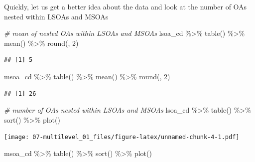 \documentclass[
]{book}
\newenvironment{Shaded}{\begin{snugshade}}{\end{snugshade}}
\newcommand{\CommentTok}[1]{\textcolor[rgb]{0.56,0.35,0.01}{\textit{#1}}}
\newcommand{\DecValTok}[1]{\textcolor[rgb]{0.00,0.00,0.81}{#1}}
\newcommand{\FunctionTok}[1]{\textcolor[rgb]{0.00,0.00,0.00}{#1}}
\newcommand{\NormalTok}[1]{#1}
\newcommand{\SpecialCharTok}[1]{\textcolor[rgb]{0.00,0.00,0.00}{#1}}
\begin{document}
Quickly, let us get a better idea about the data and look at the number of OAs nested within LSOAs and MSOAs

\begin{Shaded}
\begin{Highlighting}[]
\CommentTok{\# mean of nested OAs within LSOAs and MSOAs}
\NormalTok{lsoa\_cd }\SpecialCharTok{\%\textgreater{}\%} \FunctionTok{table}\NormalTok{() }\SpecialCharTok{\%\textgreater{}\%}
  \FunctionTok{mean}\NormalTok{() }\SpecialCharTok{\%\textgreater{}\%}
  \FunctionTok{round}\NormalTok{(, }\DecValTok{2}\NormalTok{)}
\end{Highlighting}
\end{Shaded}

\begin{verbatim}
## [1] 5
\end{verbatim}

\begin{Shaded}
\begin{Highlighting}[]
\NormalTok{msoa\_cd }\SpecialCharTok{\%\textgreater{}\%} \FunctionTok{table}\NormalTok{() }\SpecialCharTok{\%\textgreater{}\%}
  \FunctionTok{mean}\NormalTok{() }\SpecialCharTok{\%\textgreater{}\%}
  \FunctionTok{round}\NormalTok{(, }\DecValTok{2}\NormalTok{)}
\end{Highlighting}
\end{Shaded}

\begin{verbatim}
## [1] 26
\end{verbatim}

\begin{Shaded}
\begin{Highlighting}[]
\CommentTok{\# number of OAs nested within LSOAs and MSOAs}
\NormalTok{lsoa\_cd }\SpecialCharTok{\%\textgreater{}\%} \FunctionTok{table}\NormalTok{() }\SpecialCharTok{\%\textgreater{}\%}
  \FunctionTok{sort}\NormalTok{() }\SpecialCharTok{\%\textgreater{}\%}
  \FunctionTok{plot}\NormalTok{()}
\end{Highlighting}
\end{Shaded}

\texttt{[image: 07-multilevel\_01\_files/figure-latex/unnamed-chunk-4-1.pdf]}

\begin{Shaded}
\begin{Highlighting}[]
\NormalTok{msoa\_cd }\SpecialCharTok{\%\textgreater{}\%} \FunctionTok{table}\NormalTok{() }\SpecialCharTok{\%\textgreater{}\%}
  \FunctionTok{sort}\NormalTok{() }\SpecialCharTok{\%\textgreater{}\%}
  \FunctionTok{plot}\NormalTok{()}
\end{Highlighting}
\end{Shaded}
\end{document}
